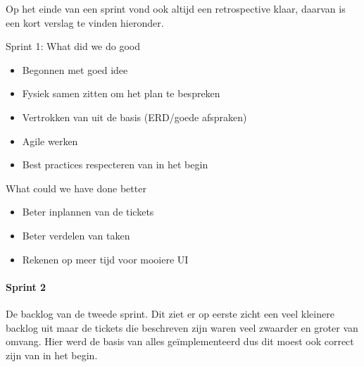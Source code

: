 Op het einde van een sprint vond ook altijd een retrospective klaar, daarvan is een kort verslag te vinden hieronder.

Sprint 1:
What did we do good

\begin{itemize}
\item Begonnen met goed idee
\item Fysiek samen zitten om het plan te bespreken
\item Vertrokken van uit de basis (ERD/goede afspraken)
\item  Agile werken
\item Best practices respecteren van in het begin
\end{itemize}

What could we have done better

\begin{itemize}
\item Beter inplannen van de tickets
\item Beter verdelen van taken
\item Rekenen op meer tijd voor mooiere UI
\end{itemize}

\paragraph{Sprint 2}
De backlog van de tweede sprint. Dit ziet er op eerste zicht een veel kleinere backlog uit maar de tickets die beschreven zijn waren veel zwaarder en groter van omvang. Hier werd de basis van alles geïmplementeerd dus dit moest ook correct zijn van in het begin.


